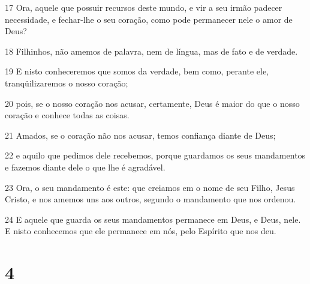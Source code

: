 \par 17 Ora, aquele que possuir recursos deste mundo, e vir a seu irmão padecer necessidade, e fechar-lhe o seu coração, como pode permanecer nele o amor de Deus?
\par 18 Filhinhos, não amemos de palavra, nem de língua, mas de fato e de verdade.
\par 19 E nisto conheceremos que somos da verdade, bem como, perante ele, tranqüilizaremos o nosso coração;
\par 20 pois, se o nosso coração nos acusar, certamente, Deus é maior do que o nosso coração e conhece todas as coisas.
\par 21 Amados, se o coração não nos acusar, temos confiança diante de Deus;
\par 22 e aquilo que pedimos dele recebemos, porque guardamos os seus mandamentos e fazemos diante dele o que lhe é agradável.
\par 23 Ora, o seu mandamento é este: que creiamos em o nome de seu Filho, Jesus Cristo, e nos amemos uns aos outros, segundo o mandamento que nos ordenou.
\par 24 E aquele que guarda os seus mandamentos permanece em Deus, e Deus, nele. E nisto conhecemos que ele permanece em nós, pelo Espírito que nos deu.

\chapter{4}

